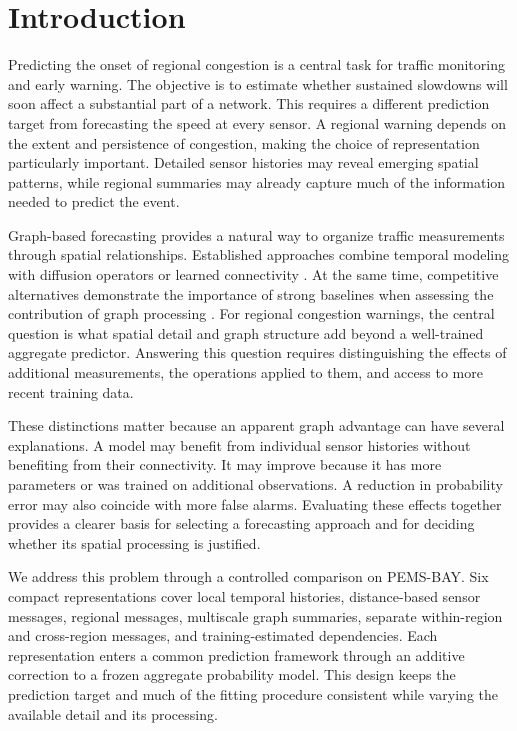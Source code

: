 \documentclass{llncs}
\begin{document}
\section{Introduction}

Predicting the onset of regional congestion is a central task for traffic monitoring and early warning. The objective is to estimate whether sustained slowdowns will soon affect a substantial part of a network. This requires a different prediction target from forecasting the speed at every sensor. A regional warning depends on the extent and persistence of congestion, making the choice of representation particularly important. Detailed sensor histories may reveal emerging spatial patterns, while regional summaries may already capture much of the information needed to predict the event.

Graph-based forecasting provides a natural way to organize traffic measurements through spatial relationships. Established approaches combine temporal modeling with diffusion operators or learned connectivity \cite{dcrnn,gwnet}. At the same time, competitive alternatives demonstrate the importance of strong baselines when assessing the contribution of graph processing \cite{simst,stid}. For regional congestion warnings, the central question is what spatial detail and graph structure add beyond a well-trained aggregate predictor. Answering this question requires distinguishing the effects of additional measurements, the operations applied to them, and access to more recent training data.

These distinctions matter because an apparent graph advantage can have several explanations. A model may benefit from individual sensor histories without benefiting from their connectivity. It may improve because it has more parameters or was trained on additional observations. A reduction in probability error may also coincide with more false alarms. Evaluating these effects together provides a clearer basis for selecting a forecasting approach and for deciding whether its spatial processing is justified.

We address this problem through a controlled comparison on PEMS-BAY. Six compact representations cover local temporal histories, distance-based sensor messages, regional messages, multiscale graph summaries, separate within-region and cross-region messages, and training-estimated dependencies. Each representation enters a common prediction framework through an additive correction to a frozen aggregate probability model. This design keeps the prediction target and much of the fitting procedure consistent while varying the available detail and its processing.
\end{document}
